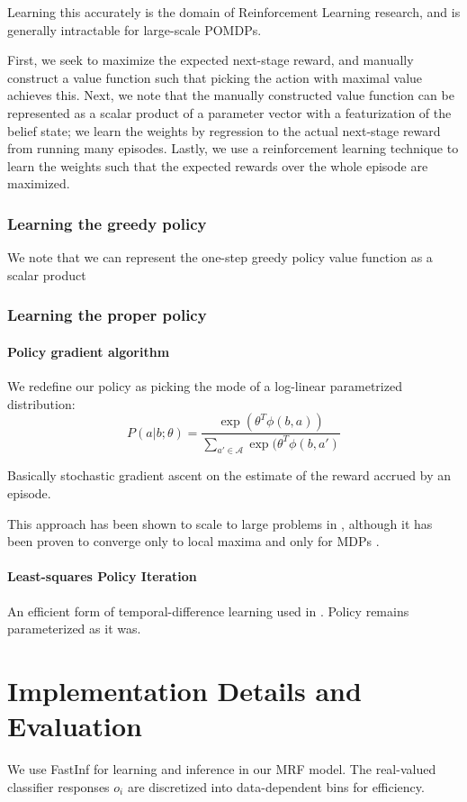 Learning this accurately is the domain of Reinforcement Learning research, and is generally intractable for large-scale POMDPs.

First, we seek to maximize the expected next-stage reward, and manually construct a value function such that picking the action with maximal value achieves this.
Next, we note that the manually constructed value function can be represented as a scalar product of a parameter vector with a featurization of the belief state; we learn the weights by regression to the actual next-stage reward from running many episodes.
Lastly, we use a reinforcement learning technique to learn the weights such that the expected rewards over the whole episode are maximized.

\subsubsection{Learning the greedy policy}
We note that we can represent the one-step greedy policy value function as a scalar product 

\subsubsection{Learning the proper policy}

\paragraph{Policy gradient algorithm}
We redefine our policy as picking the mode of a log-linear parametrized distribution:
\begin{equation}
P(a|b;\theta) = \frac{\exp(\theta^T \phi(b,a))}{\sum_{a' \in \mathcal{A}} \exp(\theta^T \phi(b,a')}
\end{equation}

Basically stochastic gradient ascent on the estimate of the reward accrued by an episode.

This approach has been shown to scale to large problems in \cite{Branavan2009}, although it has been proven to converge only to local maxima and only for MDPs \cite{Sutton2000}.


\paragraph{Least-squares Policy Iteration}
An efficient form of temporal-difference learning used in \cite{Kwok2004}.
Policy remains parameterized as it was.

\section{Implementation Details and Evaluation} \label{sec:implementation}
We use FastInf \cite{Jaimovich2010} for learning and inference in our MRF model.
The real-valued classifier responses $o_i$ are discretized into data-dependent bins for efficiency.
